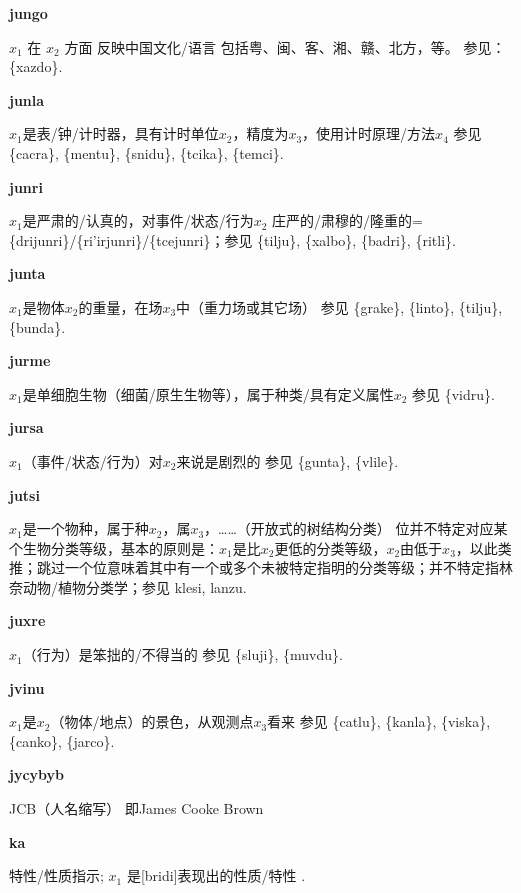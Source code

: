 \documentclass[notitlepage,twocolumn,a4paper,10pt]{book}
\begin{document}
{\sffamily\bfseries jungo}\enspace {\ttfamily\bfseries[jug]}  $x_1$ 在 $x_2$ 方面 反映中国文化\slash{}语言 \textemdash{} 包括粤、闽、客、湘、赣、北方，等。 参见： \{xazdo\}.

{\sffamily\bfseries junla}\enspace {\ttfamily\bfseries[jul]}  $x_1$是表\slash{}钟\slash{}计时器，具有计时单位$x_2$，精度为$x_3$，使用计时原理\slash{}方法$x_4$ \textemdash{} 参见 \{cacra\}, \{mentu\}, \{snidu\}, \{tcika\}, \{temci\}.

{\sffamily\bfseries junri}\enspace {\ttfamily\bfseries[jur]}  $x_1$是严肃的\slash{}认真的，对事件\slash{}状态\slash{}行为$x_2$ \textemdash{} 庄严的\slash{}肃穆的\slash{}隆重的= \{drijunri\}\slash{}\{ri'irjunri\}\slash{}\{tcejunri\}；参见 \{tilju\}, \{xalbo\}, \{badri\}, \{ritli\}.

{\sffamily\bfseries junta} $x_1$是物体$x_2$的重量，在场$x_3$中（重力场或其它场） \textemdash{} 参见 \{grake\}, \{linto\}, \{tilju\}, \{bunda\}.

{\sffamily\bfseries jurme}\enspace {\ttfamily\bfseries[jum]}  $x_1$是单细胞生物（细菌\slash{}原生生物等），属于种类\slash{}具有定义属性$x_2$ \textemdash{} 参见 \{vidru\}.

{\sffamily\bfseries jursa}\enspace {\ttfamily\bfseries[jus]}  $x_1$（事件\slash{}状态\slash{}行为）对$x_2$来说是剧烈的 \textemdash{} 参见 \{gunta\}, \{vlile\}.

{\sffamily\bfseries jutsi}\enspace {\ttfamily\bfseries[jut]}  $x_1$是一个物种，属于种$x_2$，属$x_3$，……（开放式的树结构分类） \textemdash{} 位并不特定对应某个生物分类等级，基本的原则是：$x_1$是比$x_2$更低的分类等级，$x_2$由低于$x_3$，以此类推；跳过一个位意味着其中有一个或多个未被特定指明的分类等级；并不特定指林奈动物\slash{}植物分类学；参见 {klesi}, {lanzu}.

{\sffamily\bfseries juxre}\enspace {\ttfamily\bfseries[jux]}  $x_1$（行为）是笨拙的\slash{}不得当的 \textemdash{} 参见 \{sluji\}, \{muvdu\}.

{\sffamily\bfseries jvinu}\enspace {\ttfamily\bfseries[vin     ji'u]}  $x_1$是$x_2$（物体\slash{}地点）的景色，从观测点$x_3$看来 \textemdash{} 参见 \{catlu\}, \{kanla\}, \{viska\}, \{canko\}, \{jarco\}.

{\sffamily\bfseries jycybyb} JCB（人名缩写） \textemdash{} 即James Cooke Brown

{\sffamily\bfseries ka}\enspace {\ttfamily\bfseries[kam]} \enspace {\sffamily\bfseries[NU]}  特性\slash{}性质指示; $x_1$ 是[bridi]表现出的性质\slash{}特性 .
\end{document}
